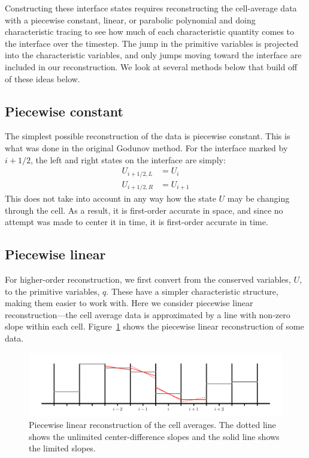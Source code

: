 Constructing these interface states requires reconstructing the
cell-average data with a piecewise constant, linear, or parabolic
polynomial and doing characteristic tracing to see how much of each
characteristic quantity comes to the interface over the timestep.  The
jump in the primitive variables is projected into the characteristic
variables, and only jumps moving toward the interface are included in
our reconstruction.  We look at several methods below that build off
of these ideas below.

\subsection{Piecewise constant}

The simplest possible reconstruction of the data is piecewise constant.
This is what was done in the original Godunov method.  For the interface
marked by $i+1/2$, the left and right states on the interface are simply:
\begin{align}
U_{i+1/2,L} &= U_i \\
U_{i+1/2,R} &= U_{i+1}
\end{align}
This does not take into account in any way how the state $U$ may be changing
through the cell.  As a result, it is first-order accurate in space, and since
no attempt was made to center it in time, it is first-order accurate in time.

\subsection{Piecewise linear}

For higher-order reconstruction, we first convert from the conserved
variables, $U$, to the primitive variables, $q$.  These have a simpler
characteristic structure, making them easier to work with.  Here we
consider piecewise linear reconstruction---the cell average data is
approximated by a line with non-zero slope within each cell.
Figure~\ref{fig:plm} shows the piecewise linear reconstruction of some
data.

\begin{figure}[t]
\centering
\includegraphics[width=\linewidth]{piecewise-linear}
\caption[Piecewise linear reconstruction of cell average
  data.]{\label{fig:plm} Piecewise linear reconstruction of the cell
  averages.  The dotted line shows the unlimited center-difference
  slopes and the solid line shows the limited slopes.}
\end{figure}

